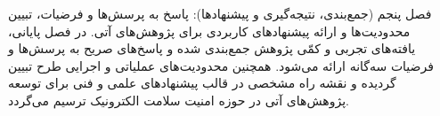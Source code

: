

فصل پنجم (جمع‌بندی، نتیجه‌گیری و پیشنهادها): پاسخ به پرسش‌ها و فرضیات، تبیین محدودیت‌ها و ارائه پیشنهادهای کاربردی برای پژوهش‌های آتی. در فصل پایانی، یافته‌های تجربی و کمّی پژوهش جمع‌بندی شده و پاسخ‌های صریح به پرسش‌ها و فرضیات سه‌گانه ارائه می‌شود. همچنین محدودیت‌های عملیاتی و اجرایی طرح تبیین گردیده و نقشه راه مشخصی در قالب پیشنهادهای علمی و فنی برای توسعه پژوهش‌های آتی در حوزه امنیت سلامت الکترونیک ترسیم می‌گردد.\par


